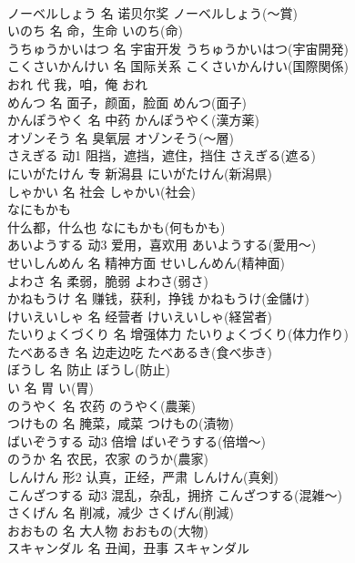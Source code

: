 \documentclass[8pt]{extreport}
\begin{document}
\begin{CJK}{UTF8}{min}
\\	ノーベルしょう	名	诺贝尔奖	ノーベルしょう(～賞)	
\\	いのち	名	命，生命	いのち(命)	
\\	うちゅうかいはつ	名	宇宙开发	うちゅうかいはつ(宇宙開発)	
\\	こくさいかんけい	名	国际关系	こくさいかんけい(国際関係)	
\\	おれ	代	我，咱，俺	おれ	
\\	めんつ	名	面子，颜面，脸面	めんつ(面子)	
\\	かんぽうやく	名	中药	かんぽうやく(漢方薬)	
\\	オゾンそう	名	臭氧层	オゾンそう(～層)	
\\	さえぎる	动1	阻挡，遮挡，遮住，挡住	さえぎる(遮る)	
\\	にいがたけん	专	新潟县	にいがたけん(新潟県)	
\\	しゃかい	名	社会	しゃかい(社会)	
\\	なにもかも	
\\	什么都，什么也	なにもかも(何もかも)	
\\	あいようする	动3	爱用，喜欢用	あいようする(愛用～)	
\\	せいしんめん	名	精神方面	せいしんめん(精神面)	
\\	よわさ	名	柔弱，脆弱	よわさ(弱さ)	
\\	かねもうけ	名	赚钱，获利，挣钱	かねもうけ(金儲け)	
\\	けいえいしゃ	名	经营者	けいえいしゃ(経営者)	
\\	たいりょくづくり	名	增强体力	たいりょくづくり(体力作り)	
\\	たべあるき	名	边走边吃	たべあるき(食べ歩き)	
\\	ぼうし	名	防止	ぼうし(防止)	
\\	い	名	胃	い(胃)	
\\	のうやく	名	农药	のうやく(農薬)	
\\	つけもの	名	腌菜，咸菜	つけもの(漬物)	
\\	ばいぞうする	动3	倍增	ばいぞうする(倍増～)	
\\	のうか	名	农民，农家	のうか(農家)	
\\	しんけん	形2	认真，正经，严肃	しんけん(真剣)	
\\	こんざつする	动3	混乱，杂乱，拥挤	こんざつする(混雑～)	
\\	さくげん	名	削减，减少	さくげん(削減)	
\\	おおもの	名	大人物	おおもの(大物)	
\\	スキャンダル	名	丑闻，丑事	スキャンダル	

\end{CJK}
\end{document}
